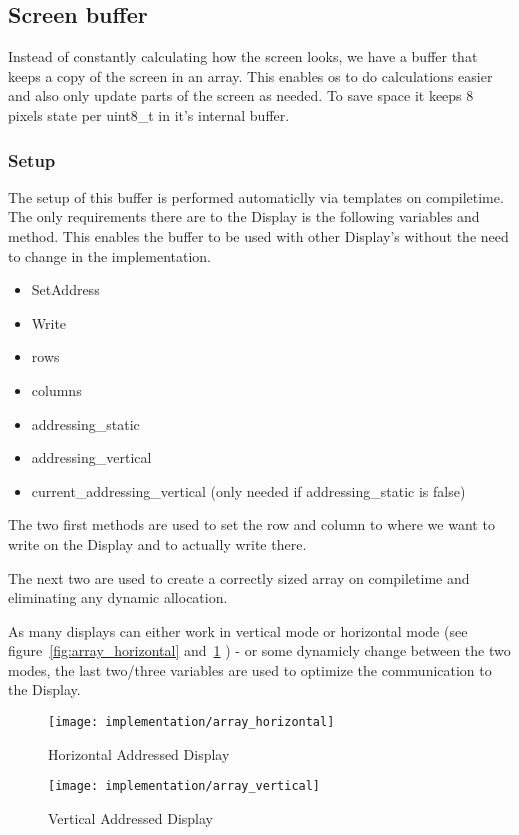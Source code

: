 \subsection{Screen buffer}

Instead of constantly calculating how the screen looks, we have a buffer that keeps a copy of the screen in an array. This enables os to do calculations easier and also only update parts of the screen as needed. To save space it keeps 8 pixels state per uint8\_t in it's internal buffer.

\subsubsection{Setup}

The setup of this buffer is performed automaticlly via templates on compiletime. The only requirements there are to the Display is the following variables and method. This enables the buffer to be used with other Display's without the need to change in the implementation.

\begin{itemize}
\item SetAddress
\item Write
\item rows
\item columns
\item addressing\_static
\item addressing\_vertical
\item current\_addressing\_vertical (only needed if addressing\_static is false)
\end{itemize}

The two first methods are used to set the row and column to where we want to write on the Display and to actually write there.

The next two are used to create a correctly sized array on compiletime and eliminating any dynamic allocation.

As many displays can either work in vertical mode or horizontal mode (see figure~\ref{fig:array_horizontal} and~\ref{fig:array_vertical} ) - or some dynamicly change between the two modes, the last two/three variables are used to optimize the communication to the Display.

\begin{figure}
\centering
\begin{minipage}{.5\textwidth}
  \centering
  \texttt{[image: implementation/array\_horizontal]}
  \caption{Horizontal Addressed Display}
  \label{fig:array_horizontal}
\end{minipage}%
\begin{minipage}{.5\textwidth}
  \centering
  \texttt{[image: implementation/array\_vertical]}
  \caption{Vertical Addressed Display}
  \label{fig:array_vertical}
\end{minipage}
\end{figure}


